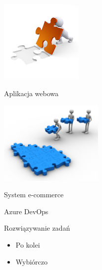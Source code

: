 \documentclass{beamer}
\begin{document}
\begin{frame}{}
	\begin{center}
		\includegraphics[height=4cm]{business.jpg}
	\end{center}
\end{frame}

\begin{frame}{}
	\begin{center}
		\Huge{Aplikacja webowa}
	\end{center}
\end{frame}

\begin{frame}{}
	\begin{center}
		\includegraphics[height=4cm]{develop1.jpg}
	\end{center}
\end{frame}

\begin{frame}{}
	\begin{center}
		\Huge{System e-commerce}
	\end{center}
\end{frame}

\begin{frame}{}
	\begin{center}
		\Huge{Azure DevOps}
	\end{center}
\end{frame}

\begin{frame}{Rozwiązywanie zadań}
	\begin{huge}
		\begin{itemize}
			\item Po kolei
			\item Wybiórczo
		\end{itemize}
	\end{huge}
\end{frame}
\end{document}
